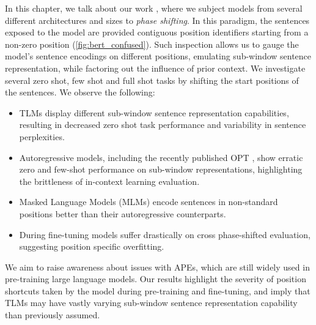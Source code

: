 \documentclass[letterpaper, 12pt]{report}
\begin{document}
In this chapter, we talk about our work \cite{sinha2022pos}, where we subject models from several different architectures and sizes to \textit{phase shifting}.
In this paradigm, the sentences exposed to the model are provided contiguous position identifiers starting from a non-zero position (\autoref{fig:bert_confused}).
Such inspection allows us to gauge the model's sentence encodings on different positions, emulating sub-window sentence representation, while factoring out the influence of prior context.
We investigate several zero shot, few shot and full shot tasks by shifting the start positions of the sentences. We observe the following:



\begin{itemize}
    \item TLMs display different sub-window sentence representation capabilities, resulting in decreased zero shot task performance and variability in sentence perplexities.
    \item Autoregressive models, including the recently published OPT \cite{Zhang2022:OPT}, show erratic zero and few-shot performance on sub-window representations, highlighting the brittleness of in-context learning evaluation.
    \item Masked Language Models (MLMs) encode sentences in non-standard positions better than their autoregressive counterparts.
    \item During fine-tuning models suffer drastically on cross phase-shifted evaluation, suggesting position specific overfitting.
\end{itemize}

\noindent We aim to raise awareness about issues with APEs, which are still widely used in pre-training large language models.
Our results highlight the severity of position shortcuts taken by the model during pre-training and fine-tuning, and imply that TLMs may have vastly varying sub-window sentence representation capability than previously assumed.
%
\end{document}
